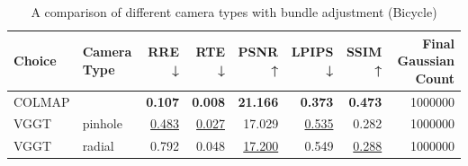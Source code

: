 \begin{table}[H]
\caption{A comparison of different camera types with bundle adjustment (Bicycle)}
\label{tab:10_camera_type_bicycle}
\begin{tabular}{llrrrrrr}
\toprule
Choice & Camera Type & RRE ↓ & RTE ↓ & PSNR ↑ & LPIPS ↓ & SSIM ↑ & Final Gaussian Count \\
\midrule
COLMAP &  & \textbf{0.107} & \textbf{0.008} & \textbf{21.166} & \textbf{0.373} & \textbf{0.473} & 1000000 \\
VGGT & pinhole & \underline{0.483} & \underline{0.027} & 17.029 & \underline{0.535} & 0.282 & 1000000 \\
VGGT & radial & 0.792 & 0.048 & \underline{17.200} & 0.549 & \underline{0.288} & 1000000 \\
\bottomrule
\end{tabular}
\end{table}

